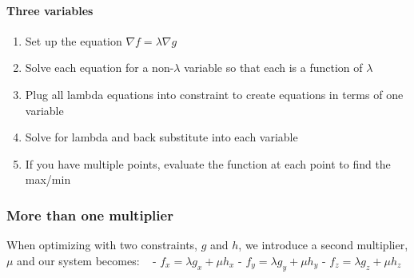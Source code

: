 \documentclass[
  letterpaper,
  DIV=11,
  numbers=noendperiod]{scrartcl}
\let\oldparagraph\paragraph
\renewcommand{\paragraph}[1]{\oldparagraph{#1}\mbox{}}
\providecommand{\tightlist}{%
  \setlength{\itemsep}{0pt}\setlength{\parskip}{0pt}}\usepackage{longtable,booktabs,array}
\begin{document}
\paragraph{Three variables}\label{three-variables}

\begin{enumerate}
\def\labelenumi{\arabic{enumi})}
\tightlist
\item
  Set up the equation \(\nabla f = \lambda \nabla g\)
\item
  Solve each equation for a non-\(\lambda\) variable so that each is a
  function of \(\lambda\)
\item
  Plug all lambda equations into constraint to create equations in terms
  of one variable
\item
  Solve for lambda and back substitute into each variable
\item
  If you have multiple points, evaluate the function at each point to
  find the max/min
\end{enumerate}

\subsubsection{More than one multiplier}\label{more-than-one-multiplier}

When optimizing with two constraints, \(g\) and \(h\), we introduce a
second multiplier, \(\mu\) and our system becomes: ~ -
\(f_x = \lambda g_x + \mu h_x\) - \(f_y = \lambda g_y + \mu h_y\) -
\(f_z = \lambda g_z + \mu h_z\)
\end{document}
